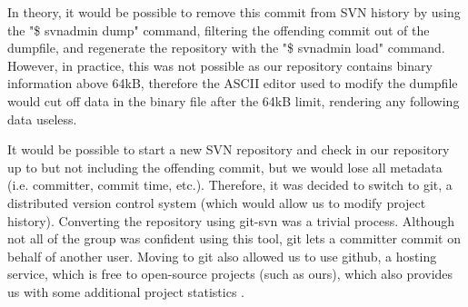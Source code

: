 In theory, it would be possible to remove this commit from SVN history by 
using the "\$ svnadmin dump" command, filtering the offending commit out of 
the dumpfile, and regenerate the repository with the "\$ svnadmin load" 
command. However, in practice, this was not possible as our repository 
contains binary information above 64kB, therefore the ASCII editor used to 
modify the dumpfile would cut off data in the binary file after the 64kB 
limit, rendering any following data useless.

It would be possible to start a new SVN repository and check in our 
repository up to but not including the offending commit, but we would lose 
all metadata (i.e. committer, commit time, etc.). Therefore, it was decided to 
switch to git, a distributed version control system (which would allow us to 
modify project history). Converting the repository using git-svn was a trivial 
process. Although not all of the group was confident using this tool, git 
lets a committer commit on behalf of another user. Moving to git also 
allowed us to use github, a hosting service, which is free to open-source 
projects (such as ours), which also provides us with some additional 
project statistics \cite{github}.
